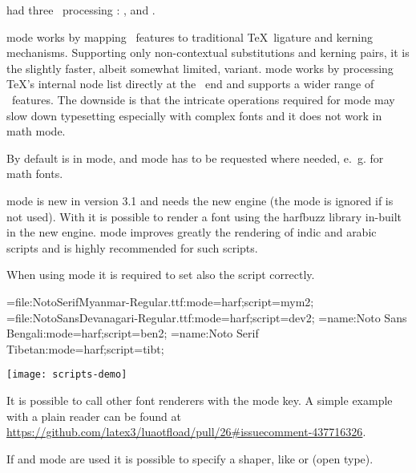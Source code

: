           had three \OpenType\ processing
         :
         ,  and .

          mode works by mapping \OpenType\
         features to traditional \TeX\ ligature and kerning mechanisms.
         Supporting only non-contextual substitutions and kerning
         pairs, it is the slightly faster, albeit somewhat limited, variant.
          mode works by processing \TeX’s internal
         node list directly at the \Lua\ end and supports
         a wider range of \OpenType\ features.
         The downside is that the intricate operations required for
         \identifier{node} mode may slow down typesetting especially
         with complex fonts and it does not work in math mode.

         By default  is in 
         mode, and \identifier{base} mode has to be requested where needed,
         e.~g. for math fonts.

          mode is new in version 3.1 and needs the new  engine (the mode is ignored if  is not used). With it is possible to render a font using the harfbuzz library in-built in the new engine.  mode improves greatly the rendering of indic and arabic scripts and is highly recommended for such scripts.

         When using  mode it is required to set also the script correctly.


         \beginlisting
         \font\burmesefont={file:NotoSerifMyanmar-Regular.ttf:mode=harf;script=mym2;}
         \font\devafont={file:NotoSansDevanagari-Regular.ttf:mode=harf;script=dev2;}
         \font\banglafont={name:Noto Sans Bengali:mode=harf;script=ben2;}
         \font\tibetanfont={name:Noto Serif Tibetan:mode=harf;script=tibt;}
         \endlisting

         \texttt{[image: scripts-demo]}


         It is possible to call other font renderers with the mode key. A simple example with a plain reader can be found at \url{https://github.com/latex3/luaotfload/pull/26#issuecomment-437716326}.

  \endaltitem
   \label{shaper-tag}
  If  and  mode are used it is possible to specify a shaper, like  or  (open type).

